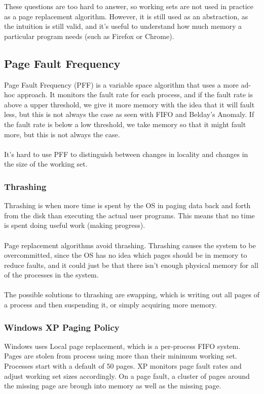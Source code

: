 \documentclass{article}
\begin{document}
These questions are too hard to answer, so working sets are not used in practice as a page replacement algorithm. However, it is still used as an abstraction, as the intuition is still valid, and it's useful to understand how much memory a particular program needs (such as Firefox or Chrome).

\subsection{Page Fault Frequency}

Page Fault Frequency (PFF) is a variable space algorithm that uses a more ad-hoc approach. It monitors the fault rate for each process, and if the fault rate is above a upper threshold, we give it more memory with the idea that it will fault less, but this is not always the case as seen with FIFO and Belday's Anomaly. If the fault rate is below a low threshold, we take memory so that it might fault more, but this is not always the case.\\
\\
It's hard to use PFF to distinguish between changes in locality and changes in the size of the working set.

\subsubsection{Thrashing}

Thrashing is when more time is spent by the OS in paging data back and forth from the disk than executing the actual user programs. This means that no time is spent doing useful work (making progress).\\
\\
Page replacement algorithms avoid thrashing. Thrashing causes the system to be overcommitted, since the OS has no idea which pages should be in memory to reduce faults, and it could just be that there isn't enough physical memory for all of the processes in the system.\\
\\
The possible solutions to thrashing are swapping, which is writing out all pages of a process and then suspending it, or simply acquiring more memory.

\subsubsection{Windows XP Paging Policy}

Windows uses Local page replacement, which is a per-process FIFO system. Pages are stolen from process using more than their minimum working set. Processes start with a default of 50 pages. XP monitors page fault rates and adjust working set sizes accordingly. On a page fault, a cluster of pages around the missing page are brough into memory as well as the missing page.
\end{document}
